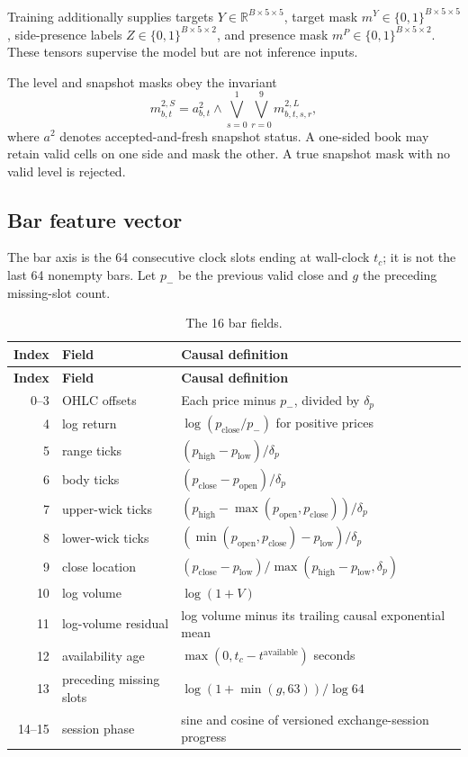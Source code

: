 \documentclass[10pt,letterpaper]{article}
\numberwithin{equation}{section}
\newcommand{\R}{\mathbb{R}}
\theoremstyle{definition}
\theoremstyle{remark}
\begin{document}
Training additionally supplies targets
\(Y\in\R^{B\times5\times5}\), target mask
\(m^Y\in\{0,1\}^{B\times5\times5}\), side-presence labels
\(Z\in\{0,1\}^{B\times5\times2}\), and presence mask
\(m^P\in\{0,1\}^{B\times5\times2}\). These tensors supervise the model but are
not inference inputs.

The level and snapshot masks obey the invariant
\begin{equation}
m^{2,S}_{b,t}=a^{2}_{b,t}\land
\bigvee_{s=0}^{1}\bigvee_{r=0}^{9}m^{2,L}_{b,t,s,r},
\label{eq:nested-mask}
\end{equation}
where $a^2$ denotes accepted-and-fresh snapshot status. A one-sided book may
retain valid cells on one side and mask the other. A true snapshot mask with no
valid level is rejected.

\subsection{Bar feature vector}

The bar axis is the 64 consecutive clock slots ending at wall-clock \(t_c\);
it is not the
last 64 nonempty bars. Let $p_{-}$ be the previous valid close and $g$ the
preceding missing-slot count.

\begin{longtable}{@{}r p{4.0cm} p{10.2cm}@{}}
\caption{The 16 bar fields.}\label{tab:bar-fields}\\
\toprule
\textbf{Index} & \textbf{Field} & \textbf{Causal definition}\\
\midrule
\endfirsthead
\toprule
\textbf{Index} & \textbf{Field} & \textbf{Causal definition}\\
\midrule
\endhead
0--3 & OHLC offsets & Each price minus $p_{-}$, divided by $\delta_p$\\
4 & log return & $\log(p_{\mathrm{close}}/p_{-})$ for positive prices\\
5 & range ticks & $(p_{\mathrm{high}}-p_{\mathrm{low}})/\delta_p$\\
6 & body ticks & $(p_{\mathrm{close}}-p_{\mathrm{open}})/\delta_p$\\
7 & upper-wick ticks & $(p_{\mathrm{high}}-\max(p_{\mathrm{open}},p_{\mathrm{close}}))/\delta_p$\\
8 & lower-wick ticks & $(\min(p_{\mathrm{open}},p_{\mathrm{close}})-p_{\mathrm{low}})/\delta_p$\\
9 & close location & $(p_{\mathrm{close}}-p_{\mathrm{low}})/\max(p_{\mathrm{high}}-p_{\mathrm{low}},\delta_p)$\\
10 & log volume & $\log(1+V)$\\
11 & log-volume residual & log volume minus its trailing causal exponential mean\\
12 & availability age & $\max(0,t_c-t^{\mathrm{available}})$ seconds\\
13 & preceding missing slots & $\log(1+\min(g,63))/\log 64$\\
14--15 & session phase & sine and cosine of versioned exchange-session progress\\
\bottomrule
\end{longtable}
\end{document}
